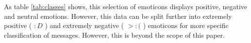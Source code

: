 As table \ref{tab:classes} shows, this selection of emoticons displays positive, negative and neutral emotions. However, this data can be split further into extremely positive ( $:D$ ) and extremely negative ( $>:($ ) emoticons for more specific classification of messages. However, this is beyond the scope of this paper.

\begin{comment}
\red{Finish the introduction, maybe move some parts to the Problem section} \\



\begin{comment}
Introduction (max 2 pages):
• Description of the problem area and the problem itself
• What is the research question / goal?
• Why is this an important / meaningful / interesting problem to consider?
• The very basic idea of the approach and why this is a reasonable approach for this problem?
\end{comment}

